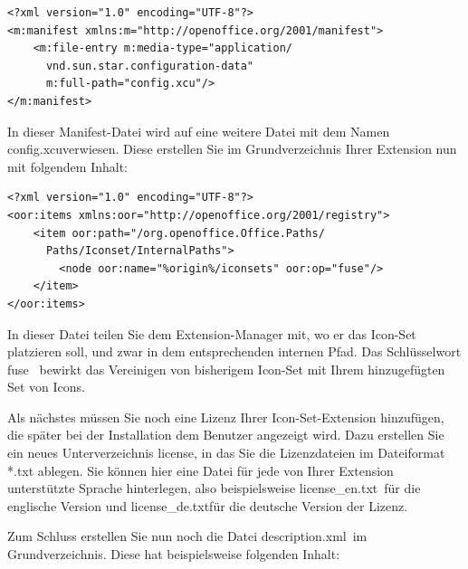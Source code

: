 \documentclass[a4paper,10pt,pagesize,titlepage]{scrbook}
\begin{document}
\begin{lstlisting}
<?xml version="1.0" encoding="UTF-8"?>
<m:manifest xmlns:m="http://openoffice.org/2001/manifest">
    <m:file-entry m:media-type="application/
      vnd.sun.star.configuration-data"
      m:full-path="config.xcu"/>
</m:manifest>
\end{lstlisting}

In dieser Manifest-Datei wird auf eine weitere Datei mit dem Namen \glqq config.xcu\grqq verwiesen. Diese erstellen Sie im Grundverzeichnis Ihrer Extension nun mit folgendem Inhalt:

\begin{lstlisting}
<?xml version="1.0" encoding="UTF-8"?>
<oor:items xmlns:oor="http://openoffice.org/2001/registry">
    <item oor:path="/org.openoffice.Office.Paths/
      Paths/Iconset/InternalPaths">
        <node oor:name="%origin%/iconsets" oor:op="fuse"/>
    </item>
</oor:items>
\end{lstlisting}

In dieser Datei teilen Sie dem Extension-Manager mit, wo er das Icon-Set platzieren soll, und zwar in dem entsprechenden internen Pfad.  Das Schlüsselwort \glqq fuse\grqq~
bewirkt das Vereinigen von bisherigem Icon-Set mit Ihrem hinzugefügten Set von Icons.

Als nächstes müssen Sie noch eine Lizenz Ihrer Icon-Set-Extension hinzufügen, die später bei der Installation dem Benutzer angezeigt wird. Dazu erstellen Sie ein neues Unterverzeichnis \glqq license\grqq, in das Sie die Lizenzdateien im Dateiformat *.txt ablegen. Sie können hier eine Datei für jede von Ihrer Extension unterstützte Sprache hinterlegen, also beispielsweise \glqq license\_en.txt\grqq~für die englische Version und \glqq license\_de.txt\grqq für die deutsche Version der Lizenz.

Zum Schluss erstellen Sie nun noch die Datei \glqq description.xml\grqq~im Grundverzeichnis. Diese hat beispielsweise folgenden Inhalt:
\end{document}
